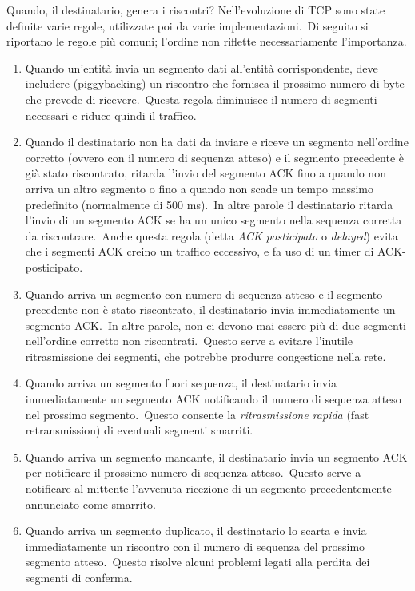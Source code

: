 Quando, il destinatario, genera i riscontri? Nell'evoluzione di TCP sono state definite varie regole, utilizzate poi da varie implementazioni.\
Di seguito si riportano le regole più comuni; l'ordine non riflette necessariamente l'importanza.

\begin{enumerate}
    \item Quando un'entità invia un segmento dati all'entità corrispondente, deve includere (piggybacking) un riscontro che fornisca il prossimo numero di byte che prevede di ricevere.\
          Questa regola diminuisce il numero di segmenti necessari e riduce quindi il traffico.
    \item Quando il destinatario non ha dati da inviare e riceve un segmento nell'ordine corretto (ovvero con il numero di sequenza atteso) e il segmento precedente è già stato riscontrato, ritarda l'invio del segmento ACK fino a quando non arriva un altro segmento o fino a quando non scade un tempo massimo predefinito (normalmente di 500 ms).\
          In altre parole il destinatario ritarda l'invio di un segmento ACK se ha un unico segmento nella sequenza corretta da riscontrare.\
          Anche questa regola (detta \emph{ACK posticipato} o \emph{delayed}) evita che i segmenti ACK creino un traffico eccessivo, e fa uso di un timer di ACK-posticipato.
    \item Quando arriva un segmento con numero di sequenza atteso e il segmento precedente non è stato riscontrato, il destinatario invia immediatamente un segmento ACK.\
          In altre parole, non ci devono mai essere più di due segmenti nell'ordine corretto non riscontrati.\
          Questo serve a evitare l'inutile ritrasmissione dei segmenti, che potrebbe produrre congestione nella rete.
    \item Quando arriva un segmento fuori sequenza, il destinatario invia immediatamente un segmento ACK notificando il numero di sequenza atteso nel prossimo segmento.\
          Questo consente la \emph{ritrasmissione rapida} (fast retransmission) di eventuali segmenti smarriti.
    \item Quando arriva un segmento mancante, il destinatario invia un segmento ACK per notificare il prossimo numero di sequenza atteso.\
          Questo serve a notificare al mittente l'avvenuta ricezione di un segmento precedentemente annunciato come smarrito.
    \item Quando arriva un segmento duplicato, il destinatario lo scarta e invia immediatamente un riscontro con il numero di sequenza del prossimo segmento atteso.\
          Questo risolve alcuni problemi legati alla perdita dei segmenti di conferma.
\end{enumerate}

